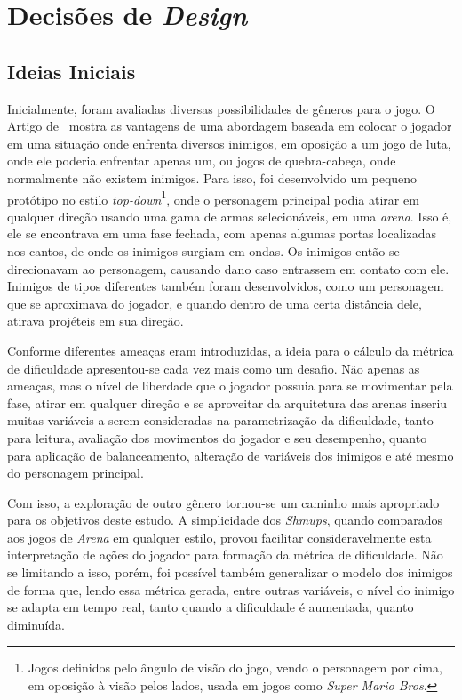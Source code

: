 
\chapter{Decisões de \textit{Design}}
\label{cap:processo de desenvolvimento}
\section{Ideias Iniciais}

Inicialmente, foram avaliadas diversas possibilidades de gêneros para o jogo. O Artigo de~\citet{DynamicDiffAdjustment} mostra as vantagens de uma abordagem baseada em colocar o jogador em uma situação onde enfrenta diversos inimigos, em oposição a um jogo de luta, onde ele poderia enfrentar apenas um, ou jogos de quebra-cabeça, onde normalmente não existem inimigos. Para isso, foi desenvolvido um pequeno protótipo no estilo \textit{top-down}\footnote{
    Jogos definidos pelo ângulo de visão do jogo, vendo o personagem por cima, em oposição à visão pelos lados, usada em jogos como \textit{Super Mario Bros}.
}, onde o personagem principal podia atirar em qualquer direção usando uma gama de armas selecionáveis, em uma \textit{arena}. Isso é, ele se encontrava em uma fase fechada, com apenas algumas portas localizadas nos cantos, de onde os inimigos surgiam em ondas. Os inimigos então se direcionavam ao personagem, causando dano caso entrassem em contato com ele. Inimigos de tipos diferentes também foram desenvolvidos, como um personagem que se aproximava do jogador, e quando dentro de uma certa distância dele, atirava projéteis em sua direção.

Conforme diferentes ameaças eram introduzidas, a ideia para o cálculo da métrica de dificuldade apresentou-se cada vez mais como um desafio. Não apenas as ameaças, mas o nível de liberdade que o jogador possuia para se movimentar pela fase, atirar em qualquer direção e se aproveitar da arquitetura das arenas inseriu muitas variáveis a serem consideradas na parametrização da dificuldade, tanto para leitura, avaliação dos movimentos do jogador e seu desempenho, quanto para aplicação de balanceamento, alteração de variáveis dos inimigos e até mesmo do personagem principal.

Com isso, a exploração de outro gênero tornou-se um caminho mais apropriado para os objetivos deste estudo. A simplicidade dos \textit{Shmups}, quando comparados aos jogos de \textit{Arena} em qualquer estilo, provou facilitar consideravelmente esta interpretação de ações do jogador para formação da métrica de dificuldade. Não se limitando a isso, porém, foi possível também generalizar o modelo dos inimigos de forma que, lendo essa métrica gerada, entre outras variáveis, o nível do inimigo se adapta em tempo real, tanto quando a dificuldade é aumentada, quanto diminuída.

